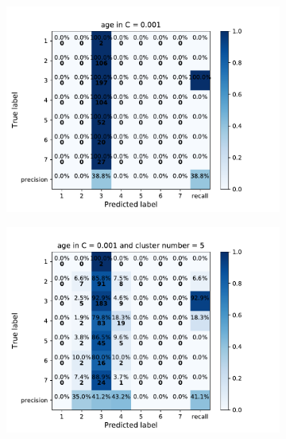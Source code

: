 {\begin{figure}[h]
    \centering
    \begin{subfigure}
      \centering
      \includegraphics[scale=0.45]{fig/super_svm_age.pdf}
    \end{subfigure}%
    \begin{subfigure}
      \centering
      \includegraphics[scale=0.45]{fig/kms_svm_age.pdf}
    \end{subfigure}
\end{figure}

}
